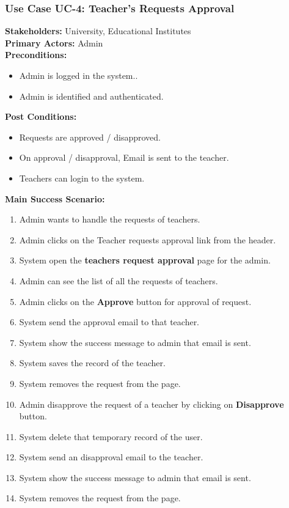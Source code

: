 \documentclass[12pt]{article}
\begin{document}
\subsubsection{Use Case UC-4: Teacher's Requests Approval}
\textbf{Stakeholders: } University, Educational Institutes \\
\textbf{Primary Actors: } Admin \\
\textbf{Preconditions:}
\begin{itemize}
\item Admin is logged in the system..
\item Admin is identified and authenticated.
\end{itemize}
\textbf{Post Conditions: }
\begin{itemize}
\item Requests are approved / disapproved.
\item On approval / disapproval, Email is sent to the teacher.
\item Teachers can login to the system.
\end{itemize}
\textbf{Main Success Scenario:}
\begin{enumerate}
\item Admin wants to handle the requests of teachers.
\item Admin clicks on the Teacher requests approval link from the header.
\item System open the \textbf{teachers request approval} page for the admin.
\item Admin can see the list of all the requests of teachers.
\item Admin clicks on the \textbf{Approve} button for approval of request.
\item System send the approval email to that teacher.
\item System show the success message to admin that email is sent.
\item System saves the record of the teacher.
\item System removes the request from the page.
\item Admin disapprove the request of a teacher by clicking on \textbf{Disapprove} button.
\item System delete that temporary record of the user.
\item System send an disapproval email to the teacher.
\item System show the success message to admin that email is sent.
\item System removes the request from the page.
\end{enumerate}
\end{document}
